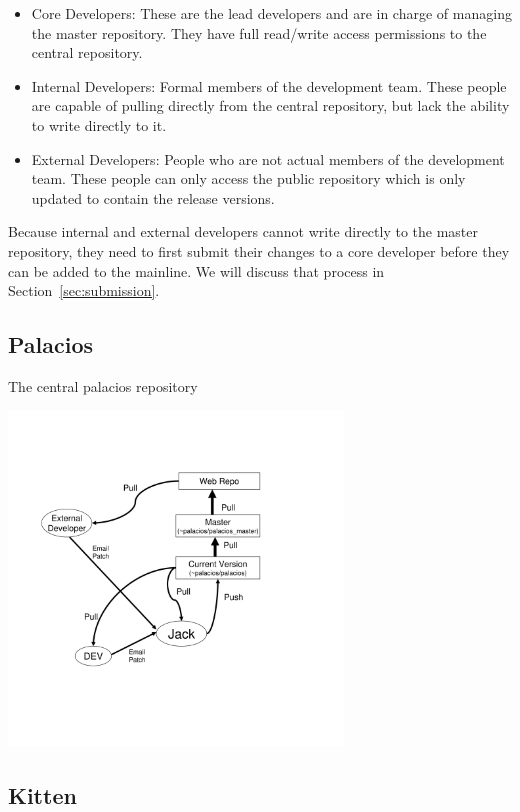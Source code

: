 \documentclass[11pt]{article}
\begin{document}
\begin{itemize}
\item Core Developers: These are the lead developers and are in
charge of managing the master repository. They have full read/write
access permissions to the central repository.

\item Internal Developers: Formal members of the development
team. These people are capable of pulling directly from the central
repository, but lack the ability to write directly to it. 

\item External Developers: People who are not actual members of the
development team. These people can only access the public repository
which is only updated to contain the release versions. 
\end{itemize}

Because internal and external developers cannot write directly to the
master repository, they need to first submit their changes to a core
developer before they can be added to the mainline. We will discuss
that process in Section~\ref{sec:submission}.


\subsection{Palacios}

The central palacios repository 

\includegraphics[height=3.5in]{dev_chart.pdf}

\subsection{Kitten}
\end{document}
